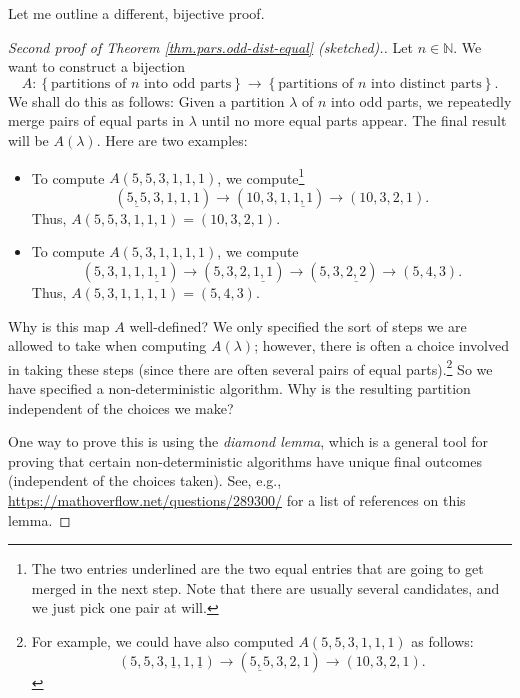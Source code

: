 Let me outline a different, bijective proof.

\begin{proof}
[Second proof of Theorem \ref{thm.pars.odd-dist-equal} (sketched).]Let
$n\in\mathbb{N}$. We want to construct a bijection%
\[
A:\left\{  \text{partitions of }n\text{ into odd parts}\right\}
\rightarrow\left\{  \text{partitions of }n\text{ into distinct parts}\right\}
.
\]
We shall do this as follows: Given a partition $\lambda$ of $n$ into odd
parts, we repeatedly merge pairs of equal parts in $\lambda$ until no more
equal parts appear. The final result will be $A\left(  \lambda\right)  $. Here
are two examples:

\begin{itemize}
\item To compute $A\left(  5,5,3,1,1,1\right)  $, we compute\footnote{The two
entries underlined are the two equal entries that are going to get merged in
the next step. Note that there are usually several candidates, and we just
pick one pair at will.}%
\[
\left(  \underline{5,5},3,1,1,1\right)  \rightarrow\left(
10,3,1,\underline{1,1}\right)  \rightarrow\left(  10,3,2,1\right)  .
\]
Thus, $A\left(  5,5,3,1,1,1\right)  =\left(  10,3,2,1\right)  $.

\item To compute $A\left(  5,3,1,1,1,1\right)  $, we compute%
\[
\left(  5,3,1,1,\underline{1,1}\right)  \rightarrow\left(
5,3,2,\underline{1,1}\right)  \rightarrow\left(  5,3,\underline{2,2}\right)
\rightarrow\left(  5,4,3\right)  .
\]
Thus, $A\left(  5,3,1,1,1,1\right)  =\left(  5,4,3\right)  $.
\end{itemize}

Why is this map $A$ well-defined? We only specified the sort of steps we are
allowed to take when computing $A\left(  \lambda\right)  $; however, there is
often a choice involved in taking these steps (since there are often several
pairs of equal parts).\footnote{For example, we could have also computed
$A\left(  5,5,3,1,1,1\right)  $ as follows:%
\[
\left(  5,5,3,\underline{1},1,\underline{1}\right)  \rightarrow\left(
\underline{5,5},3,2,1\right)  \rightarrow\left(  10,3,2,1\right)  .
\]
} So we have specified a non-deterministic algorithm. Why is the resulting
partition independent of the choices we make?

One way to prove this is using the \emph{diamond lemma}, which is a general
tool for proving that certain non-deterministic algorithms have unique final
outcomes (independent of the choices taken). See, e.g.,
\url{https://mathoverflow.net/questions/289300/} for a list of references on
this lemma.


\end{proof}
